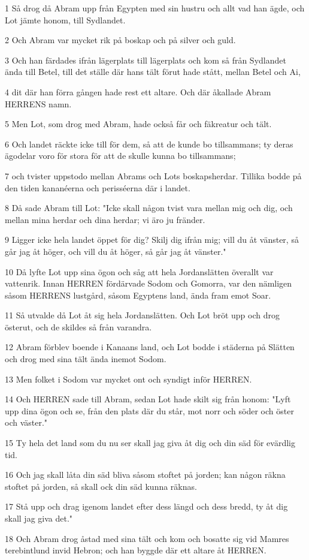 \par 1 Så drog då Abram upp från Egypten med sin hustru och allt vad han ägde, och Lot jämte honom, till Sydlandet.
\par 2 Och Abram var mycket rik på boskap och på silver och guld.
\par 3 Och han färdades ifrån lägerplats till lägerplats och kom så från Sydlandet ända till Betel, till det ställe där hans tält förut hade stått, mellan Betel och Ai,
\par 4 dit där han förra gången hade rest ett altare. Och där åkallade Abram HERRENS namn.
\par 5 Men Lot, som drog med Abram, hade också får och fäkreatur och tält.
\par 6 Och landet räckte icke till för dem, så att de kunde bo tillsammans; ty deras ägodelar voro för stora för att de skulle kunna bo tillsammans;
\par 7 och tvister uppstodo mellan Abrams och Lots boskapsherdar. Tillika bodde på den tiden kananéerna och perisséerna där i landet.
\par 8 Då sade Abram till Lot: "Icke skall någon tvist vara mellan mig och dig, och mellan mina herdar och dina herdar; vi äro ju fränder.
\par 9 Ligger icke hela landet öppet för dig? Skilj dig ifrån mig; vill du åt vänster, så går jag åt höger, och vill du åt höger, så går jag åt vänster."
\par 10 Då lyfte Lot upp sina ögon och såg att hela Jordanslätten överallt var vattenrik. Innan HERREN fördärvade Sodom och Gomorra, var den nämligen såsom HERRENS lustgård, såsom Egyptens land, ända fram emot Soar.
\par 11 Så utvalde då Lot åt sig hela Jordanslätten. Och Lot bröt upp och drog österut, och de skildes så från varandra.
\par 12 Abram förblev boende i Kanaans land, och Lot bodde i städerna på Slätten och drog med sina tält ända inemot Sodom.
\par 13 Men folket i Sodom var mycket ont och syndigt inför HERREN.
\par 14 Och HERREN sade till Abram, sedan Lot hade skilt sig från honom: "Lyft upp dina ögon och se, från den plats där du står, mot norr och söder och öster och väster."
\par 15 Ty hela det land som du nu ser skall jag giva åt dig och din säd för evärdlig tid.
\par 16 Och jag skall låta din säd bliva såsom stoftet på jorden; kan någon räkna stoftet på jorden, så skall ock din säd kunna räknas.
\par 17 Stå upp och drag igenom landet efter dess längd och dess bredd, ty åt dig skall jag giva det."
\par 18 Och Abram drog åstad med sina tält och kom och bosatte sig vid Mamres terebintlund invid Hebron; och han byggde där ett altare åt HERREN.

